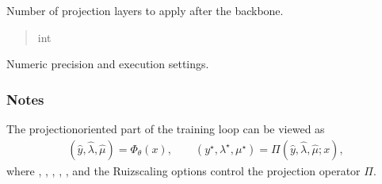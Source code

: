 \documentclass[letterpaper,10pt,english,openany,oneside]{sphinxmanual}
\begin{document}
\begin{fulllineitems}
\begin{fulllineitems}
\end{fulllineitems}


\begin{fulllineitems}
\label{\detokenize{api/package/hyperparameters:opt.training.config.TrainConfig.k_layer}}
\pysigstartsignatures
{}
\pysigstopsignatures
\sphinxAtStartPar
Number of projection layers to apply after the backbone.
\begin{quote}\begin{description}
\sphinxAtStartPar
int

\end{description}\end{quote}

\end{fulllineitems}



\begin{fulllineitems}

\pysigstartsignatures
{}
\pysigstopsignatures
\sphinxAtStartPar
Numeric precision and execution settings.

\end{fulllineitems}

\subsubsection*{Notes}

\sphinxAtStartPar
The projection\sphinxhyphen{}oriented part of the training loop can be viewed as
\begin{equation*}
\begin{split}(\hat y, \hat \lambda, \hat \mu) = \Phi_\theta(x), \qquad
(y^\star, \lambda^\star, \mu^\star) = \Pi(\hat y, \hat \lambda, \hat \mu; x),\end{split}
\end{equation*}
\sphinxAtStartPar
where , , , , , and
the Ruiz\sphinxhyphen{}scaling options control the projection operator \(\Pi\).

\end{fulllineitems}
\end{document}
